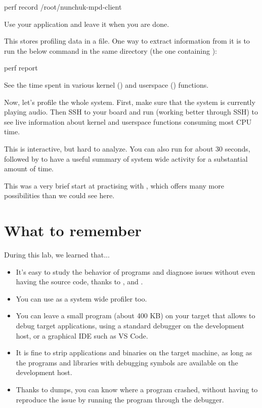 \begin{bashinput}
perf record /root/nunchuk-mpd-client
\end{bashinput}

Use your application and leave it when you are done.

This stores profiling data in a  file. One way to
extract information from it is to run the below command in the same
directory (the one containing ):

\begin{bashinput}
perf report
\end{bashinput}

See the time spent in various kernel (\code{[k]}) and userspace
(\code{[.]}) functions.

Now, let's profile the whole system. First, make sure that the system is
currently playing audio. Then SSH to your board and run 
(working better through SSH) to see live information about kernel and
userspace functions consuming most CPU time.

This is interactive, but hard to analyze. You can also run  for about 30 seconds, followed by  to have
a useful summary of system wide activity for a substantial amount of time.

This was a very brief start at practising with , which offers
many more possibilities than we could see here.

\section{What to remember}

During this lab, we learned that...

\begin{itemize}
\item It's easy to study the behavior of programs and diagnose issues
  without even having the source code, thanks to ,
   and .

\item You can use  as a system wide profiler too.

\item You can leave a small  program (about 400 KB) on your target
  that allows to debug target applications, using a standard 
  debugger on the development host, or a graphical IDE such as VS Code.

\item It is fine to strip applications and binaries on the target
  machine, as long as the programs and libraries with debugging
  symbols are available on the development host.

\item Thanks to  dumps, you can know where a program crashed,
  without having to reproduce the issue by running the program through
  the debugger.
\end{itemize}

